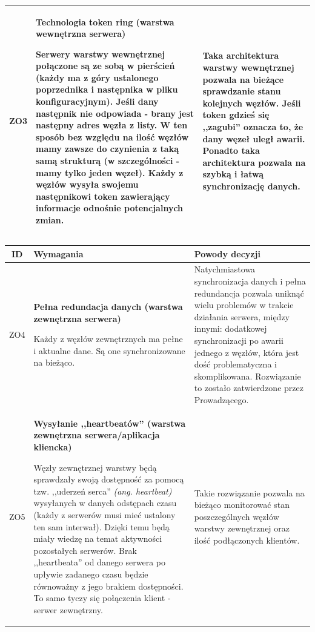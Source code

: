 {\begin{tabularx}{\textwidth}{|c|X|X|}
\label{z:ZO3} ZO3 &  \textbf{Technologia token ring (warstwa wewnętrzna serwera)}

Serwery warstwy wewnętrznej połączone są ze sobą w pierścień (każdy ma z góry ustalonego poprzednika i następnika w pliku konfiguracyjnym). Jeśli dany następnik nie odpowiada - brany jest następny adres węzła z listy. W ten sposób bez względu na ilość węzłów mamy zawsze do czynienia z taką samą strukturą (w szczególności - mamy tylko jeden węzeł). Każdy z węzłów wysyła swojemu następnikowi token zawierający informacje odnośnie potencjalnych zmian. & 
Taka architektura warstwy wewnętrznej pozwala na bieżące sprawdzanie stanu kolejnych węzłów. Jeśli token gdzieś się ,,zagubi'' oznacza to, że dany węzeł uległ awarii. Ponadto taka architektura pozwala na szybką i łatwą synchronizację danych. \\
\hline

\end{tabularx}

\pagebreak

\begin{tabularx}{\textwidth}{|c|X|X|}
\hline
\textbf{ID} & \textbf{Wymagania}  & \textbf{Powody decyzji} \\
\hline
\label{z:ZO4} ZO4 &  \textbf{Pełna redundacja danych (warstwa zewnętrzna serwera)}

Każdy z węzłów zewnętrznych ma pełne i aktualne dane. Są one synchronizowane na bieżąco. & 
Natychmiastowa synchronizacja danych i pełna redundancja pozwala uniknąć wielu problemów w trakcie działania serwera, między innymi: dodatkowej synchronizacji po awarii jednego z węzłów, która jest dość problematyczna i skomplikowana. Rozwiązanie to zostało zatwierdzone przez Prowadzącego.\\
\hline

\label{z:ZO5} ZO5 &  \textbf{Wysyłanie ,,heartbeatów'' (warstwa zewnętrzna serwera/aplikacja kliencka)}

Węzły zewnętrznej warstwy będą sprawdzały swoją dostępność za pomocą tzw. ,,uderzeń serca'' \textit{(ang. heartbeat)} wysyłanych w danych odstępach czasu (każdy z serwerów musi mieć ustalony ten sam interwał). Dzięki temu będą miały wiedzę na temat aktywności pozostałych serwerów. Brak ,,heartbeata'' od danego serwera po upływie zadanego czasu będzie równoważny z jego brakiem dostępności. To samo tyczy się połączenia klient - serwer zewnętrzny. & 
Takie rozwiązanie pozwala na bieżąco monitorować stan poszczególnych węzłów warstwy zewnętrznej oraz ilość podłączonych klientów. \\
\hline


\end{tabularx}}
